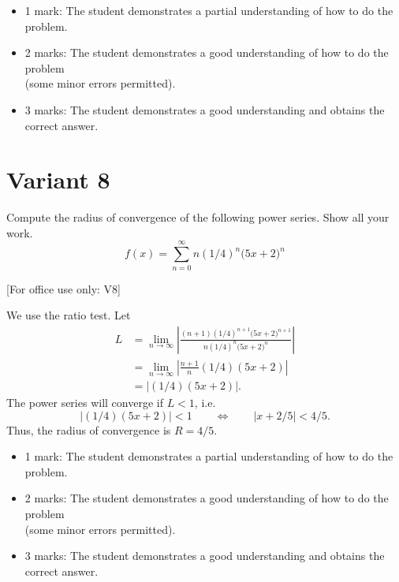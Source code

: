 \documentclass{article}
\begin{document}
            \begin{small}
            \begin{itemize}
            \item 1 mark: The student demonstrates a partial understanding of how to do the problem.
            \item 2 marks: The student demonstrates a good understanding of how to do the problem \\ (some minor errors permitted).
            \item 3 marks: The student demonstrates a good understanding and obtains the correct answer.
            \end{itemize}
            \end{small}


        \newpage
        \section{Variant 8}
        \label{v8}


Compute the radius of convergence of the following power series. Show all your work.
    \[
    f(x) = \sum_{n=0}^\infty n\left(1/4\right)^n \big(5x + 2\big)^n
    \]


[For office use only: V8]
        \medskip



    We use the ratio test. Let
      \begin{align*}
        L &= \lim_{n\to\infty} \left| 
        \frac{(n+1)\left(1/4\right)^{n+1}\big(5x + 2\big)^{n+1}}
        {n\left(1/4\right)^n \big(5x + 2\big)^n}
        \right|\\
        &= \lim_{n\to\infty} \left| \frac{n+1}{n}(1/4)(5x+2)\right| \\
        &= \left| (1/4)(5x+2)\right|.
       \end{align*}
       The power series will converge if $L < 1$, i.e.
       \[
        \left| (1/4)(5x+2)\right| < 1 \qquad\Longleftrightarrow \qquad
        \left|x + 2/5\right| < 4/5.
       \]
       Thus, the radius of convergence is $R = 4/5$.
        \medskip

            \begin{small}
            \begin{itemize}
            \item 1 mark: The student demonstrates a partial understanding of how to do the problem.
            \item 2 marks: The student demonstrates a good understanding of how to do the problem \\ (some minor errors permitted).
            \item 3 marks: The student demonstrates a good understanding and obtains the correct answer.
            \end{itemize}
            \end{small}
\end{document}
